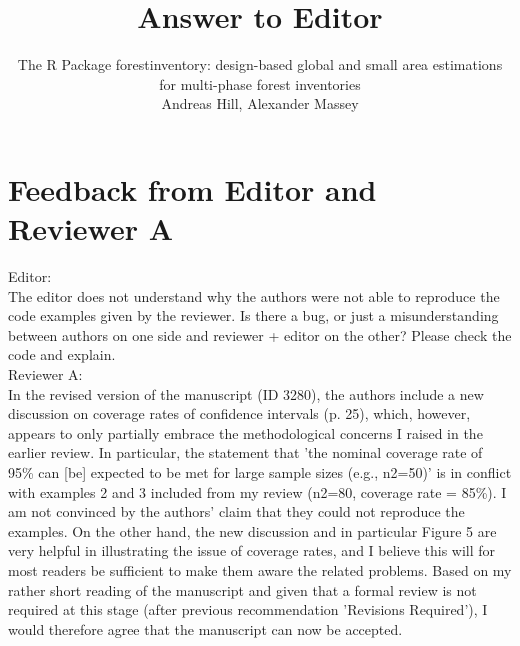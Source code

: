 \documentclass{article}
\title{Answer to Editor}
\author{The R Package forestinventory: design-based global and small area estimations for multi-phase forest inventories\\
Andreas Hill, Alexander Massey}
\begin{document}

\maketitle
\thispagestyle{empty}
\newpage

\setcounter{page}{1}

\pagestyle{fancy} %
\fancyfoot[C]{\thepage}
\setlength{\headsep}{15mm}

\newcommand{\answer}[1]{\small \color{mybrown}{#1} \color{black}}
\newcommand{\note}[1]{\textit{\small \color{amaranth} \textbf{Note:} #1} \color{black}}
\newcommand{\todo}[1]{\color{red}{#1} \color{black}}
\newcommand{\answerfin}[1]{\small \color{mygreen}{#1} \color{black}}
\newcommand{\code}[1]{\texttt{#1}}



\section*{Feedback from Editor and Reviewer A}

Editor:\\
The editor does not understand why the authors were not able to reproduce the code examples given by the reviewer. Is there a bug, or just a misunderstanding between authors on one side and reviewer + editor on the other? Please check the code and explain.\\

Reviewer A:\\
In the revised version of the manuscript (ID 3280), the authors include a new discussion on coverage rates of confidence intervals (p. 25), which, however, appears to only partially embrace the methodological concerns I raised in the earlier review. In particular, the statement that 'the nominal coverage rate of 95\% can [be] expected to be met for large sample sizes (e.g., n2=50)' is in conflict with examples 2 and 3 included from my review (n2=80, coverage rate = 85\%). I am not convinced by the authors' claim that they could not reproduce the examples. On the other hand, the new discussion and in particular Figure 5 are very helpful in illustrating the issue of coverage rates, and I believe this will for most readers be sufficient to make them aware the related problems. Based on my rather short reading of the manuscript and given that a formal review is not required at this stage (after previous recommendation 'Revisions Required'), I would therefore agree that the manuscript can now be accepted.
\end{document}
